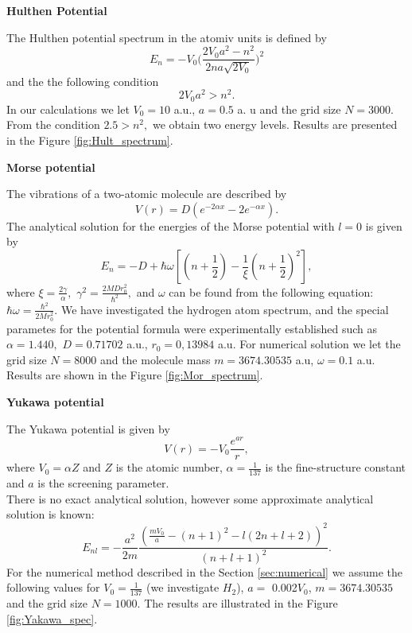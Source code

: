 \documentclass[a4paper, 14pt]{article}
\begin{document}
\begin{center}
		\large
		\textbf{Hulthen Potential}		\\[0.5 cm]
\end{center}
The Hulthen potential spectrum in the atomiv units is defined by
$$E_n = -V_0\bigg(\frac{2 V_0 a^2 - n^2}{2n a \sqrt{2V_0}}\bigg)^2$$
and the the following condition
$$2 V_0 a^2 > n^2.$$
In our calculations we let  $V_0 = 10$ a.u., $a = 0.5$ a. u and the grid size $N = 3000$.  From the condition  $2.5 > n^2,$ we obtain  two energy levels. Results are presented in the Figure \ref{fig:Hult_spectrum}.


\begin{center}
		\large
		\textbf{Morse potential}		\\[0.5 cm]
\end{center}
The vibrations of a two-atomic molecule are described by
$$V(r) = D(e^{-2\alpha x} - 2e^{-\alpha x}).$$
The analytical solution for the energies of the Morse potential with $l=0$ is given by
$$E_n = -D + \hbar \omega [(n+\frac{1}{2}) - \frac{1}{\xi}(n+\frac{1}{2})^2],$$
where $\xi = \frac{2 \gamma}{\alpha},$ $\gamma^2 = \frac{2 M D r_0^2}{\hbar^2},$ and $\omega$ can be found from the following equation: $\hbar \omega = \frac{\hbar^2}{2 M  r_0^2}.$
We have investigated  the hydrogen atom spectrum, and the special parametes for the potential formula were experimentally established such as $\alpha = 1.440,$  $D= 0.71702$ a.u., $r_0= 0,13984$ a.u. For numerical solution we let the grid size $N = 8000$ and the molecule mass $m = 3674.30535 $ a.u, $\omega  = 0.1 $ a.u. Results are shown in the Figure \ref{fig:Mor_spectrum}.

\begin{center}
		\large
		\textbf{Yukawa potential}		\\[0.5 cm]
\end{center}
The Yukawa potential is given by
\begin{equation}\label{yukawa_pot}
    V(r) = -V_0\frac{e^{a r}}{r},
\end{equation}
where $V_0 = \alpha Z$ and $Z$ is the atomic number, $\alpha = \frac{1}{137}$ is the fine-structure constant and $a$ is the screening parameter.\\
There is no exact analytical solution, however some approximate analytical solution is known: 
$$E_{nl} = -\frac{a^2}{2m}\frac{(\displaystyle{\frac{m V_0}{a}} - (n+1)^2 - l(2n+l+2))^2}{(n+l+1)^2}.$$
For the numerical method described in the Section \ref{sec:numerical} we assume the following values for $V_0 = \frac{1}{137}$ (we investigate $H_2$), $a =$ 0.002$V_0$,  $m = 3674.30535 $ and the grid size $N = 1000.$ The results are illustrated in the Figure \ref{fig:Yakawa_spec}.
\end{document}
